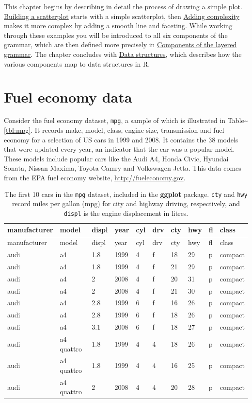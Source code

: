 This chapter begins by describing in detail the process of drawing a
simple plot. \hyperref[sec:simple-plot]{Building a scatterplot} starts
with a simple scatterplot, then \hyperref[sec:complex-plot]{Adding
complexity} makes it more complex by adding a smooth line and faceting.
While working through these examples you will be introduced to all six
components of the grammar, which are then defined more precisely in
\hyperref[sec:components]{Components of the layered grammar}. The
chapter concludes with \hyperref[sec:data-structures]{Data structures},
which describes how the various components map to data structures in R.

\section{Fuel economy data}\label{sec:fuel-economy-data}

Consider the fuel economy dataset, \texttt{mpg}, a sample of which is
illustrated in Table\textasciitilde{}\ref{tbl:mpg}. It records make,
model, class, engine size, transmission and fuel economy for a selection
of US cars in 1999 and 2008. It contains the 38 models that were updated
every year, an indicator that the car was a popular model. These models
include popular cars like the Audi A4, Honda Civic, Hyundai Sonata,
Nissan Maxima, Toyota Camry and Volkswagen Jetta. This data comes from
the EPA fuel economy website, \url{http://fueleconomy.gov}.

\begin{longtable}[c]{@{}llllllllll@{}}
\caption{The first 10 cars in the \texttt{mpg} dataset, included in the
\textbf{ggplot} package. \texttt{cty} and \texttt{hwy} record miles per
gallon (mpg) for city and highway driving, respectively, and
\texttt{displ} is the engine displacement in litres.}\tabularnewline
\toprule
manufacturer & model & displ & year & cyl & drv & cty & hwy & fl &
class\tabularnewline
\midrule
\endfirsthead
\toprule
manufacturer & model & displ & year & cyl & drv & cty & hwy & fl &
class\tabularnewline
\midrule
\endhead
audi & a4 & 1.8 & 1999 & 4 & f & 18 & 29 & p & compact\tabularnewline
audi & a4 & 1.8 & 1999 & 4 & f & 21 & 29 & p & compact\tabularnewline
audi & a4 & 2 & 2008 & 4 & f & 20 & 31 & p & compact\tabularnewline
audi & a4 & 2 & 2008 & 4 & f & 21 & 30 & p & compact\tabularnewline
audi & a4 & 2.8 & 1999 & 6 & f & 16 & 26 & p & compact\tabularnewline
audi & a4 & 2.8 & 1999 & 6 & f & 18 & 26 & p & compact\tabularnewline
audi & a4 & 3.1 & 2008 & 6 & f & 18 & 27 & p & compact\tabularnewline
audi & a4 quattro & 1.8 & 1999 & 4 & 4 & 18 & 26 & p &
compact\tabularnewline
audi & a4 quattro & 1.8 & 1999 & 4 & 4 & 16 & 25 & p &
compact\tabularnewline
audi & a4 quattro & 2 & 2008 & 4 & 4 & 20 & 28 & p &
compact\tabularnewline
\bottomrule
\end{longtable}

